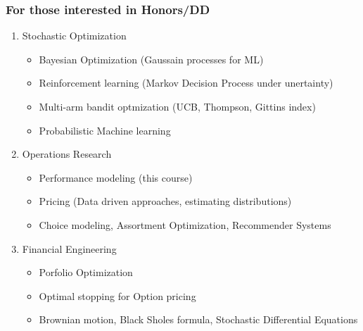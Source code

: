 \documentclass{beamer}
\def \mp {\pause}
\def \mp {}
\newcommand{\ft}[1]{\frametitle{#1}}
\begin{document}
 \begin{frame}
  \ft{For those interested in Honors/DD}
  \begin{enumerate} \setlength\itemsep{1em}
  \mp \item Stochastic Optimization
  \begin{itemize} \setlength\itemsep{.41em}
   \mp \item Bayesian Optimization (Gaussain processes for ML)
   \mp\item Reinforcement learning (Markov Decision Process under unertainty)
   \mp\item Multi-arm bandit optmization (UCB, Thompson, Gittins index)
   \mp\item Probabilistic Machine learning
  \end{itemize}

  \mp\item Operations Research
  \begin{itemize} \setlength\itemsep{.41em}
   \mp\item Performance modeling (this course)
   \mp\item Pricing (Data driven approaches, estimating distributions)
   \mp\item Choice modeling, Assortment Optimization, Recommender Systems
   \end{itemize}

   \mp\item Financial Engineering
   \begin{itemize} \setlength\itemsep{.41em}
    \mp\item Porfolio Optimization
    \mp\item Optimal stopping for Option pricing
    \mp\item Brownian motion, Black Sholes formula, Stochastic Differential Equations
   \end{itemize}
  \end{enumerate}

 \end{frame}

 
 
 
\end{document}
